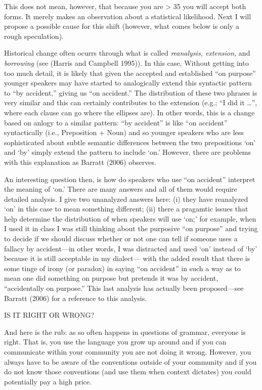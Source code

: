 \documentclass{wpblogentry}
\begin{document}
This does not mean, however, that because you are > 35 you will accept both forms. It merely makes an observation about a statistical likelihood. Next I will propose a possible cause for this shift (however, what comes below is only a rough speculation).

Historical change often ocurrs through what is called \emph{reanalysis, extension,} and \emph{borrowing} (see (Harris and Campbell 1995)). In this case, Without getting into too much detail, it is likely that given the accepted and established ``on purpose'' younger speakers may have started to analogically extend this syntactic pattern to ``by accident,'' giving us ``on accident.'' The distribution of these two phrases is very similar and this can certainly contributes to the extension (e.g.; ``I did it \ldots'', where each clause can go where the ellipses are). In other words, this is a change based on anlogy to a similar pattern: ``by accident'' is like ``on accident'' syntactically (i.e., Preposition + Noun) and so younger speakers who are less sophisticated about subtle semantic differences between the two prepositions `on' and `by' simply extend the pattern to include `on.' However, there are problems with this explanation as Barratt (2006) observes.

An interesting question then, is how do speakers who use ``on accident'' interpret the meaning of `on.' There are many answers and all of them would require detailed analysis. I give two unanalyzed answers here: (i) they have reanalyzed `on' in this case to mean something different; (ii) there a pragamtic issues that help determine the distribution of when speakers will use `on;' for example, when I used it in class I was still thinking about the purposive ``on purpose'' and trying to decide if we should discuss whether or not one can tell if someone uses a fallacy by accident---in other words, I was distracted and used `on' instead of `by' because it is still acceptable in my dialect--- with the added result that there is some tinge of irony (or paradox) in saying ``on accident'' in such a way as to mean one did something on purpose but pretends it was by accident, ``accidentally on purpose.'' This last analysis has actually been proposed---see Barratt (2006) for a reference to this analysis.  


IS IT RIGHT OR WRONG?

And here is the rub: as so often happens in questions of grammar, everyone is right. That is, you use the language you grow up around and if you can communicate within your community you are not doing it wrong. However, you always have to be aware of the conventions outside of your community and if you do not know those conventions (and use them when context dictates) you could potentially pay a high price.
\end{document}
